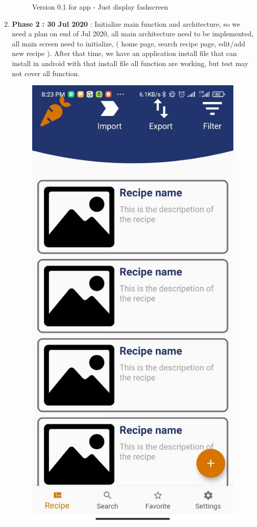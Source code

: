 \documentclass{article}
\begin{document}
\begin{enumerate}
\begin{figure}[h!]
            \caption{Version 0.1 for app - Just display fashscreen}
            \label{fig:cookingbook}
            \end{figure}
        \item \textbf{Phase 2 : 30 Jul 2020} : Initialize main function and architecture, so we need a plan on end of Jul 2020, all main architecture need to be implemented, all main screen need to initialize, ( home page, search recipe page, edit/add new recipe ). After that time, we have an application install file that can install in android with that install file all function are working, but test may not cover all function.\\
        \begin{figure}[h!]
        \centering
        \includegraphics[scale=0.33]{Images/CookingBook.jpg}

\end{figure}
\end{enumerate}
\end{document}
